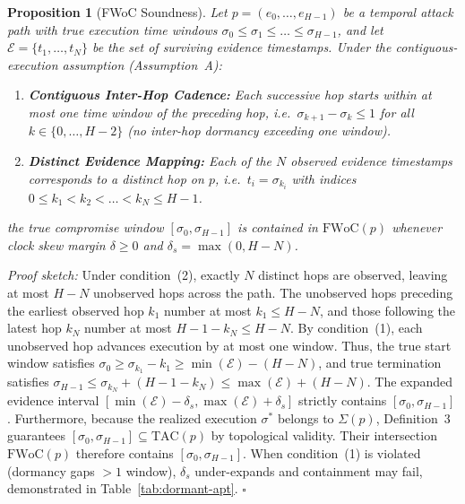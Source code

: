 \documentclass[12pt]{article}
\newtheorem{proposition}{Proposition}
\begin{document}
\begin{proposition}[FWoC Soundness]\label{prop:soundness}
\textit{Let $p = (e_0, \dots, e_{H-1})$ be a temporal attack path with true execution time windows $\sigma_0 \le \sigma_1 \le \dots \le \sigma_{H-1}$, and let $\mathcal{E} = \{t_1, \dots, t_N\}$ be the set of surviving evidence timestamps. Under the contiguous-execution assumption (Assumption~A):}
\begin{enumerate}
    \item \textit{\textbf{Contiguous Inter-Hop Cadence:} Each successive hop starts within at most one time window of the preceding hop, i.e.\ $\sigma_{k+1} - \sigma_k \le 1$ for all $k \in \{0, \dots, H-2\}$ (no inter-hop dormancy exceeding one window).}
    \item \textit{\textbf{Distinct Evidence Mapping:} Each of the $N$ observed evidence timestamps corresponds to a distinct hop on $p$, i.e.\ $t_i = \sigma_{k_i}$ with indices $0 \le k_1 < k_2 < \dots < k_N \le H-1$.}
\end{enumerate}
\textit{the true compromise window $[\sigma_0, \sigma_{H-1}]$ is contained in $\text{FWoC}(p)$ whenever clock skew margin $\delta \ge 0$ and $\delta_s = \max(0, H-N)$.}
\end{proposition}

\textit{Proof sketch:} Under condition~(2), exactly $N$ distinct hops are observed, leaving at most $H - N$ unobserved hops across the path. The unobserved hops preceding the earliest observed hop $k_1$ number at most $k_1 \le H - N$, and those following the latest hop $k_N$ number at most $H - 1 - k_N \le H - N$. By condition~(1), each unobserved hop advances execution by at most one window. Thus, the true start window satisfies $\sigma_0 \ge \sigma_{k_1} - k_1 \ge \min(\mathcal{E}) - (H - N)$, and true termination satisfies $\sigma_{H-1} \le \sigma_{k_N} + (H - 1 - k_N) \le \max(\mathcal{E}) + (H - N)$. The expanded evidence interval $[\min(\mathcal{E}) - \delta_s, \max(\mathcal{E}) + \delta_s]$ strictly contains $[\sigma_0, \sigma_{H-1}]$. Furthermore, because the realized execution $\sigma^*$ belongs to $\Sigma(p)$, Definition~3 guarantees $[\sigma_0, \sigma_{H-1}] \subseteq \text{TAC}(p)$ by topological validity. Their intersection $\text{FWoC}(p)$ therefore contains $[\sigma_0, \sigma_{H-1}]$. When condition~(1) is violated (dormancy gaps $> 1$ window), $\delta_s$ under-expands and containment may fail, demonstrated in Table~\ref{tab:dormant-apt}. $\square$
\end{document}
